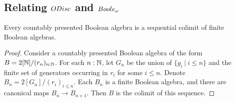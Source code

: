 \subsection{Relating $\ODisc$ and $\Boole$}
\begin{lemma}\label{BooleIsODisc}
  Every countably presented Boolean algebra is a sequential colimit of finite Boolean algebras. 
\end{lemma}
\begin{proof}
  Consider a countably presented Boolean algebra of the form $B = 2[\mathbb{N}]/(r_n)_{n:\mathbb{N}}$. 
  For each $n:\mathbb{N}$, let $G_n$ be the union of $\{g_i\ |\ {i\leq n}\}$ and 
  the finite set of generators occurring in $r_i$ for some $i\leq n$. 
  Denote $B_n = 2[G_n]/(r_i)_{i\leq n}$. 
  Each $B_n$ is a finite Boolean algebra, and there are canonical maps $B_n \to B_{n+1}$.
  Then $B$ is the colimit of this sequence. 
%
%
\end{proof}





